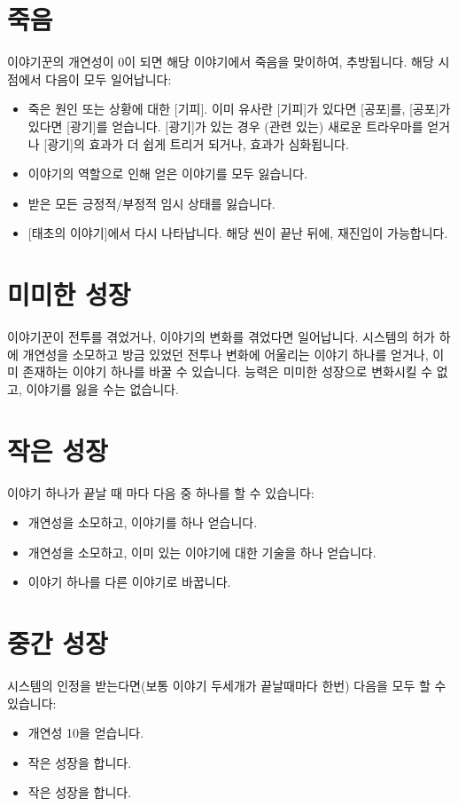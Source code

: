 \documentclass[12pt]{report}
\begin{document}
	\section*{죽음}
	이야기꾼의 개연성이 0이 되면 해당 이야기에서 죽음을 맞이하여, 추방됩니다. 해당 시점에서 다음이 모두 일어납니다:
	\begin{itemize}
		\item 죽은 원인 또는 상황에 대한 [기피]. 이미 유사란 [기피]가 있다면 [공포]를, [공포]가 있다면 [광기]를 얻습니다. [광기]가 있는 경우 (관련 있는) 새로운 트라우마를 얻거나 [광기]의 효과가 더 쉽게 트리거 되거나, 효과가 심화됩니다.
		\item 이야기의 역할으로 인해 얻은 이야기를 모두 잃습니다.
		\item 받은 모든 긍정적/부정적 임시 상태를 잃습니다.
		\item {}[태초의 이야기]에서 다시 나타납니다. 해당 씬이 끝난 뒤에, 재진입이 가능합니다.
	\end{itemize}
	
	\section*{미미한 성장}
	이야기꾼이 전투를 겪었거나, 이야기의 변화를 겪었다면 일어납니다. 시스템의 허가 하에 개연성을 소모하고 방금 있었던 전투나 변화에 어울리는 이야기 하나를 얻거나, 이미 존재하는 이야기 하나를 바꿀 수 있습니다. 능력은 미미한 성장으로 변화시킬 수 없고, 이야기를 잃을 수는 없습니다.
	
	\section*{작은 성장}
	이야기 하나가 끝날 때 마다 다음 중 하나를 할 수 있습니다:
	\begin{itemize}
		\item 개연성을 소모하고, 이야기를 하나 얻습니다.
		\item 개연성을 소모하고, 이미 있는 이야기에 대한 기술을 하나 얻습니다.
		\item 이야기 하나를 다른 이야기로 바꿉니다.
	\end{itemize}
	
	\section*{중간 성장}
	시스템의 인정을 받는다면(보통 이야기 두세개가 끝날때마다 한번) 다음을 모두 할 수 있습니다:
	\begin{itemize}
		\item 개연성 10을 얻습니다.
		\item 작은 성장을 합니다.
		\item 작은 성장을 합니다.
	\end{itemize}
	
\end{document}
